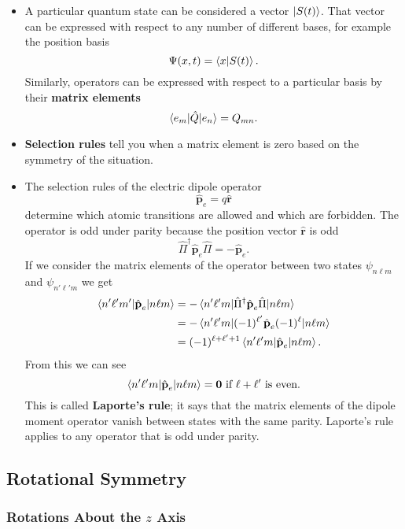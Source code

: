 \documentclass{article}
\renewcommand{\vec}[1]{\boldsymbol{\mathbf{#1}}}
\newcommand{\uvec}[1]{\hat{\vec{#1}}}
\begin{document}
\begin{itemize}
  \item A particular quantum state can be considered a vector $\ket{S(t)}$. That vector can be expressed with respect to any number of different bases, for example the position basis \[\Psi(x, t) = \braket{x | S(t)}.\] Similarly, operators can be expressed with respect to a particular basis by their \textbf{matrix elements} \[\braket{e_m | \hat{Q} | e_n} = Q_{m n}.\]

  \item \textbf{Selection rules} tell you when a matrix element is zero based on the symmetry of the situation.

  \item The selection rules of the electric dipole operator \[\uvec{p}_e = q \uvec{r}\] determine which atomic transitions are allowed and which are forbidden. The operator is odd under parity because the position vector $\uvec{r}$ is odd \[\hat{\Pi}^\dagger \uvec{p}_e \hat{\Pi} = -\uvec{p}_e.\] If we consider the matrix elements of the operator between two states $\psi_{n \ell m}$ and $\psi_{n' \ell' m}$ we get \begin{align*}
          \braket{n' \ell' m' | \uvec{p}_e | n \ell m} & = -\braket{n' \ell' m | \hat{\Pi}^\dagger \uvec{p}_e \hat{\Pi} | n \ell m} \\
                                                       & = -\braket{n' \ell' m | (-1)^{\ell'} \uvec{p}_e (-1)^\ell | n \ell m}      \\
                                                       & = (-1)^{\ell + \ell' + 1} \braket{n' \ell' m | \uvec{p}_e | n \ell m}.     \\
        \end{align*} From this we can see \[\braket{n' \ell' m | \uvec{p}_e | n \ell m} = \vec{0} \text{ if } \ell + \ell' \text{ is even.}\] This is called \textbf{Laporte's rule}; it says that the matrix elements of the dipole moment operator vanish between states with the same parity. Laporte's rule applies to any operator that is odd under parity.
\end{itemize}

\subsection{Rotational Symmetry}

\subsubsection{Rotations About the $z$ Axis}
\end{document}
